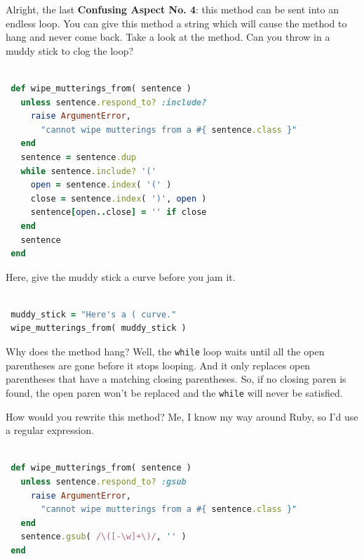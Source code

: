 \documentclass[10pt,twoside]{report}
\begin{document}
Alright, the last {\bf Confusing Aspect No. 4}: this method can be
sent into an endless loop. You can give this method a string which
will cause the method to hang and never come back. Take a look at the
method.  Can you throw in a muddy stick to clog the loop?


\begin{lstlisting}[basicstyle=\ttfamily\color{basiccolor},
    commentstyle = \ttfamily\color{commentcolor},
    keywordstyle=\ttfamily\color{keywordscolor},
    stringstyle=\color{stringcolor},
    language=Ruby,
    basicstyle=\small\ttfamily,
    showstringspaces=false,
  ]

 def wipe_mutterings_from( sentence )
   unless sentence.respond_to? :include?
     raise ArgumentError,
       "cannot wipe mutterings from a #{ sentence.class }"
   end
   sentence = sentence.dup
   while sentence.include? '('
     open = sentence.index( '(' )
     close = sentence.index( ')', open )
     sentence[open..close] = '' if close
   end
   sentence
 end

\end{lstlisting}


Here, give the muddy stick a curve before you jam it.


\begin{lstlisting}[basicstyle=\ttfamily\color{basiccolor},
    commentstyle = \ttfamily\color{commentcolor},
    keywordstyle=\ttfamily\color{keywordscolor},
    stringstyle=\color{stringcolor},
    language=Ruby,
    basicstyle=\small\ttfamily,
    showstringspaces=false,
  ]

 muddy_stick = "Here's a ( curve."
 wipe_mutterings_from( muddy_stick )

\end{lstlisting}


Why does the method hang?  Well, the
\lstinline[breaklines=true]|while| loop waits until all the open
parentheses are gone before it stops looping.  And it only replaces
open parentheses that have a matching closing parentheses.  So, if no
closing paren is found, the open paren won't be replaced and the
\lstinline[breaklines=true]|while| will never be satisfied.

How would you rewrite this method?  Me, I know my way around Ruby, so
I'd use a regular expression.


\begin{lstlisting}[basicstyle=\ttfamily\color{basiccolor},
    commentstyle = \ttfamily\color{commentcolor},
    keywordstyle=\ttfamily\color{keywordscolor},
    stringstyle=\color{stringcolor},
    language=Ruby,
    basicstyle=\small\ttfamily,
    showstringspaces=false,
  ]

 def wipe_mutterings_from( sentence )
   unless sentence.respond_to? :gsub
     raise ArgumentError,
       "cannot wipe mutterings from a #{ sentence.class }"
   end
   sentence.gsub( /\([-\w]+\)/, '' )
 end

\end{lstlisting}
\end{document}
